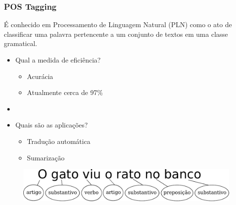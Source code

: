 \documentclass[10pt]{beamer}
\begin{document}
\begin{frame}[fragile]
  \frametitle{POS Tagging}

  É conhecido em Processamento de Linguagem Natural (PLN) como o ato de classificar uma palavra pertencente a um conjunto de textos em uma classe gramatical.

    \begin{itemize}
      \item Qual a medida de eficiência? 
      \begin{itemize}
        \item[-] Acurácia
        \item[-] Atualmente cerca de 97\%
      \end{itemize}

      \item[\ ] \ 

      \item Quais são as aplicações?
      \begin{itemize}
        \item[-] Tradução automática
        \item[-] Sumarização
      \end{itemize}

    \end{itemize}

  
    \begin{figure}[htb]
    \begin{center}
        \includegraphics[scale=0.5]{img/exemploclassificacao.pdf}
    \end{center}
  \end{figure}

\end{frame}
\end{document}
